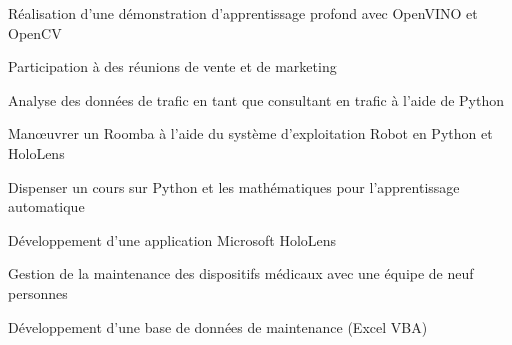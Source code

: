 \begin{tightemize}
\item Réalisation d'une démonstration d'apprentissage profond avec OpenVINO et OpenCV
\item Participation à des réunions de vente et de marketing
\end{tightemize}
\sectionsep

\newpage

\begin{tightemize}
\item Analyse des données de trafic en tant que consultant en trafic à l'aide de Python
\end{tightemize}
\sectionsep

\begin{tightemize}
\item Manœuvrer un Roomba à l'aide du système d'exploitation Robot en Python et HoloLens
\end{tightemize}
\sectionsep

\begin{tightemize}
\item Dispenser un cours sur Python et les mathématiques pour l'apprentissage automatique
\end{tightemize}
\sectionsep

\begin{tightemize}
\item Développement d'une application Microsoft HoloLens
\end{tightemize}
\sectionsep

\begin{tightemize}
\item Gestion de la maintenance des dispositifs médicaux avec une équipe de neuf personnes
\item Développement d'une base de données de maintenance (Excel VBA)
\end{tightemize}
\sectionsep

\vspace{3mm}


